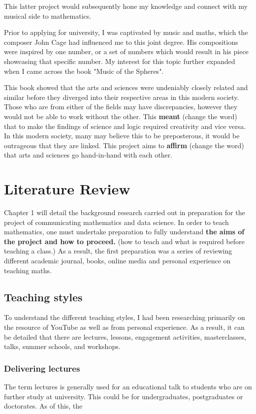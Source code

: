 \documentclass[12pt, a4paper,oneside]{book}
\numberwithin{equation}{section}
\begin{document}
This latter project would subsequently hone my knowledge and connect with my musical side to mathematics.

Prior to applying for university, I was captivated by music and maths, which the composer John Cage had influenced me to this joint degree. His compositions were inspired by one number, or a set of numbers which would result in his piece showcasing that specific number. My interest for this topic further expanded when I came across the book "Music of the Spheres".

This book showed that the arts and sciences were undeniably closely related and similar before they diverged into their respective areas in this modern society. Those who are from either of the fields may have discrepancies, however they would not be able to work without the other. This \textbf{meant} (change the word) that to make the findings of science and logic required creativity and vice versa. In this modern society, many may believe this to be preposterous, it would be outrageous that they are linked. This project aims to \textbf{affirm} (change the word) that arts and sciences go hand-in-hand with each other.

\chapter{Literature Review}\label{ch:2}

Chapter 1 will detail the background research carried out in preparation for the project of communicating mathematics and data science. In order to teach mathematics, one must undertake preparation to fully understand \textbf{the aims of the project and how to proceed.} (how to teach and what is required before teaching a class.)  As a result, the first preparation was a series of reviewing different academic journal, books, online media and personal experience on teaching maths.

\section{Teaching styles}\label{sec:2.1}

To understand the different teaching styles, I had been researching primarily on the resource of YouTube as well as from personal experience. As a result, it can be detailed that there are lectures, lessons, engagement activities, masterclasses, talks, summer schools, and workshops.

\subsection{Delivering lectures}
The term lectures is generally used for an educational talk to students who are on further study at university. This could be for undergraduates, postgraduates or doctorates. As of this, the
\end{document}
